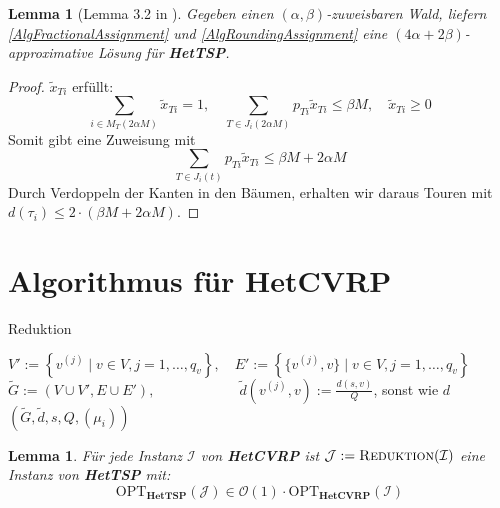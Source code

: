 \documentclass[a4paper,ngerman,12pt,bibtotoc]{scrartcl}
\theoremstyle{definition}
\theoremstyle{plain}
\newtheorem{lemma}[defn]{Lemma}
\theoremstyle{remark}
\newcommand{\Ic}{\mathcal{I}}
\newcommand{\Jc}{\mathcal{J}}
\newcommand{\Oc}{\mathcal{O}}
\newcommand{\OPT}{\mathrm{OPT}}
\newcommand{\HetTSP}{\textbf{HetTSP}}
\newcommand{\HetCVRP}{\textbf{HetCVRP}}
\begin{document}
	\begin{lemma}[Lemma 3.2 in \cite{HetCVRP}]
		Gegeben einen $(\alpha, \beta)$-zuweisbaren Wald, liefern \cref{AlgFractionalAssignment} und \cref{AlgRoundingAssignment} eine $(4\alpha+2\beta)$-approximative Lösung für \HetTSP.
	\end{lemma}
	
	\begin{proof}
		$\tilde{x}_{Ti}$ erfüllt:
			\[\sum_{i\in M_T(2\alpha M)} \tilde{x}_{Ti} = 1, \quad \sum_{T\in J_i(2\alpha M)} p_{Ti}\tilde{x}_{Ti} \leq \beta M, \quad \tilde{x}_{Ti} \geq 0 \]
		Somit gibt  eine Zuweisung mit 	
			\[\sum_{T\in J_i(t)} p_{Ti}\tilde{x}_{Ti} \leq \beta M + 2\alpha M\]
		Durch Verdoppeln der Kanten in den Bäumen, erhalten wir daraus Touren mit $d(\tau_i) \leq 2\cdot \left(\beta M + 2\alpha M\right)$.
	\end{proof}
	
	\section{Algorithmus für \HetCVRP}
	
	\begin{algorithm}[H]
		\caption{Reduktion}\label{AlgReduktion}
		\begin{algorithmic}[1]
			\State $V' := \left\lbrace v^{(j)} \mid v \in V, j=1,\dots,q_v\right\rbrace,\quad E' := \left\lbrace \{v^{(j)},v\} \mid v \in V, j=1,\dots,q_v\right\rbrace$
			\State $\tilde{G} := (V\cup V', E\cup E'), \quad\quad\quad\quad\quad\quad \tilde{d}(v^{(j)},v) := \frac{d(s,v)}{Q}$, sonst wie $d$
			\State \Return $\left(\tilde{G}, \tilde{d}, s, Q, (\mu_i)\right)$
			\EndProcedure
		\end{algorithmic}
	\end{algorithm}	
	
	\begin{lemma}
		Für jede Instanz $\Ic$ von \HetCVRP{} ist $\Jc := \textsc{Reduktion}(\Ic)$ eine Instanz von \HetTSP{} mit:
			\[\OPT_\HetTSP(\Jc) \in \Oc(1)\cdot\OPT_\HetCVRP(\Ic)\]
	\end{lemma}
	
\end{document}

